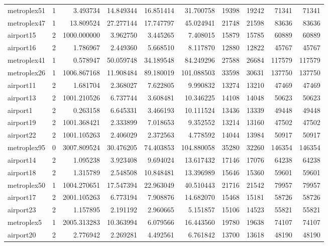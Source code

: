 \begin{longtable}{|l|r|r|r|r|r|r|r|r|r|}
metroplex51 & 1 & 3.493734 & 14.849344 & 16.851414 & 31.700758 & 19398 & 19242 & 71341 & 71341 \\
metroplex47 & 1 & 13.809524 & 27.277144 & 17.747797 & 45.024941 & 21748 & 21598 & 83636 & 83636 \\
airport15 & 2 & 1000.000000 & 3.962750 & 3.445265 & 7.408015 & 15879 & 15785 & 60889 & 60889 \\
airport16 & 2 & 1.786967 & 2.449360 & 5.668510 & 8.117870 & 12880 & 12822 & 45767 & 45767 \\
metroplex41 & 1 & 0.578947 & 50.059748 & 34.189548 & 84.249296 & 27588 & 26684 & 117579 & 117579 \\
metroplex26 & 1 & 1006.867168 & 11.908484 & 89.180019 & 101.088503 & 33598 & 30631 & 137750 & 137750 \\
airport11 & 2 & 1.681704 & 2.368027 & 7.622805 & 9.990832 & 13274 & 13210 & 47469 & 47469 \\
airport13 & 2 & 1001.210526 & 6.737744 & 3.608481 & 10.346225 & 14108 & 14048 & 50623 & 50623 \\
airport1 & 2 & 0.263158 & 6.645331 & 3.466193 & 10.111524 & 13436 & 13339 & 49448 & 49448 \\
airport19 & 2 & 1001.368421 & 2.333899 & 7.018653 & 9.352552 & 13214 & 13160 & 47502 & 47502 \\
airport22 & 2 & 1001.105263 & 2.406029 & 2.372563 & 4.778592 & 14044 & 13984 & 50917 & 50917 \\
metroplex95 & 0 & 3007.809524 & 30.476205 & 74.403853 & 104.880058 & 35280 & 32260 & 146354 & 146354 \\
airport14 & 2 & 1.095238 & 3.923408 & 9.694024 & 13.617432 & 17146 & 17076 & 64238 & 64238 \\
airport18 & 2 & 1.315789 & 2.548508 & 10.848481 & 13.396989 & 15646 & 15360 & 59601 & 59601 \\
metroplex50 & 1 & 1004.270651 & 17.547394 & 22.963049 & 40.510443 & 21716 & 21542 & 79957 & 79957 \\
airport17 & 2 & 2001.105263 & 6.773194 & 7.908876 & 14.682070 & 15468 & 15181 & 58726 & 58726 \\
airport23 & 2 & 1.157895 & 2.191192 & 2.960665 & 5.151857 & 15106 & 14523 & 55821 & 55821 \\
metroplex5 & 1 & 2005.313283 & 10.363994 & 6.079566 & 16.443560 & 19780 & 19638 & 74107 & 74107 \\
airport20 & 2 & 2.776942 & 2.269281 & 4.492561 & 6.761842 & 13700 & 13618 & 48190 & 48190 \\

\end{longtable}
